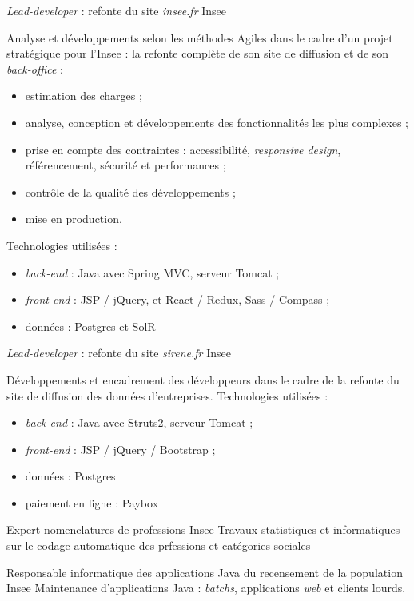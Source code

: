 \documentclass[11pt,a4paper,roman]{moderncv}       %
\begin{document}
{\emph{Lead-developer} : refonte du site \emph{insee.fr}}
{Insee}
{}
{}
{Analyse et développements selon les méthodes Agiles dans le cadre d'un projet stratégique pour l'Insee : la refonte complète de son site de diffusion et de son \emph{back-office} :
\begin{itemize}%
  \item estimation des charges ;
  \item analyse, conception et développements des fonctionnalités les plus complexes ;
  \item prise en compte des contraintes : accessibilité, \emph{responsive design}, référencement,  sécurité et performances ;
  \item contrôle de la qualité des développements ;
  \item mise en production.
\end{itemize}%
Technologies utilisées :
\begin{itemize}%
  \item \emph{back-end} : Java avec Spring MVC, serveur Tomcat ;
  \item \emph{front-end} : JSP / jQuery, et React / Redux, Sass / Compass ;
  \item données : Postgres et SolR
\end{itemize}}

{\emph{Lead-developer} : refonte du site \emph{sirene.fr}}
{Insee}
{}
{}
{Développements et encadrement des développeurs dans le cadre de la refonte du site de diffusion des données d'entreprises.
\newline Technologies utilisées :
\begin{itemize}%
  \item \emph{back-end} : Java avec Struts2, serveur Tomcat ;
  \item \emph{front-end} : JSP / jQuery / Bootstrap ;
  \item données : Postgres
  \item paiement en ligne : Paybox
\end{itemize}}

{Expert nomenclatures de professions}
{Insee}
{}
{}
{Travaux statistiques et informatiques sur le codage automatique des prfessions et catégories sociales}

{Responsable informatique des applications Java du recensement de la population}
{Insee}
{}
{}
{Maintenance d'applications Java : \emph{batchs}, applications \emph{web} et clients lourds.}
\end{document}
